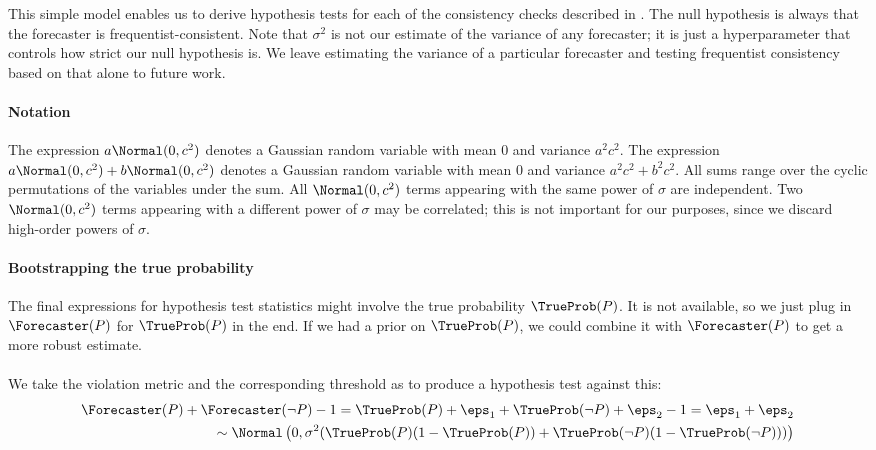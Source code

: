 This simple model enables us to derive hypothesis tests for each of the consistency checks described in .
The null hypothesis is always that the forecaster is frequentist-consistent.
Note that $\sigma^2$ is not our estimate of the variance of any forecaster; it is just a hyperparameter that controls how strict our null hypothesis is.
We leave estimating the variance of a particular forecaster and testing frequentist consistency based on that alone to future work.

\paragraph{Notation}
The expression $a \Normal(0, c^2)$ denotes a Gaussian random variable with mean 0 and variance $a^2 c^2$.
The expression $a \Normal(0, c^2) + b \Normal(0, c^2)$ denotes a Gaussian random variable with mean 0 and variance $a^2 c^2 + b^2 c^2$.
All sums range over the cyclic permutations of the variables under the sum.
All $\Normal(0, c^2)$ terms appearing with the same power of $\sigma$ are independent.
Two $\Normal(0, c^2)$ terms appearing with a different power of $\sigma$ may be correlated; this is not important for our purposes, since we discard high-order powers of $\sigma$.

\paragraph{Bootstrapping the true probability}
The final expressions for hypothesis test statistics might involve the true probability $\TrueProb(P)$.
It is not available, so we just plug in $\Forecaster(P)$ for $\TrueProb(P)$ in the end.
If we had a prior on $\TrueProb(P)$, we could combine it with $\Forecaster(P)$ to get a more robust estimate.


\paragraph{\NegChecker}
We take the violation metric and the corresponding threshold as to produce a hypothesis test against this:
\begin{align*}
   \Forecaster(P) + \Forecaster(\neg P) - 1
   = \TrueProb(P) + \eps_1 + \TrueProb(\neg P) + \eps_2 - 1
   = \eps_1 + \eps_2
   \\
   \sim \Normal\left(0, \sigma^2 (\TrueProb(P)(1 - \TrueProb(P)) + \TrueProb(\neg P)(1 - \TrueProb(\neg P))) \right)
\end{align*}


